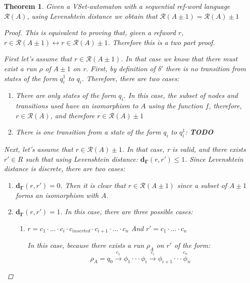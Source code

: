 \documentclass{article}
\newcommand{\lra}{\longrightarrow}
\newtheorem{theorem}{Theorem}
\begin{document}
\begin{theorem}
    Given a VSet-automaton with a sequential ref-word language $\mathcal{R}(A)$, using Levenshtein distance we obtain that $\mathcal{R}(A \pm 1) = \mathcal{R}(A) \pm 1$

    \begin{proof}
        This is equivalent to proving that, given a refword $r$, $r \in \mathcal{R}(A \pm 1) \leftrightarrow r \in \mathcal{R}(A)\pm 1$. Therefore this is a two part proof.

        First let's assume that $r \in \mathcal{R}(A \pm 1)$. In that case we know that there must exist a run $\rho$ of $A \pm 1$ on r. First, by definition of $\delta'$ there is no transition from states of the form $q_i^1$ to $q_i$. Therefore, there are two cases:
        \begin{enumerate}
            \item There are only states of the form $q_i$. In this case, the subset of nodes and transitions used have an isomorphism to $A$ using the function $f$, therefore, $r \in \mathcal{R}(A)$, and therefore $r \in \mathcal{R}(A) \pm 1$
            \item There is one transition from a state of the form $q_i$ to $q_i^1$: \textbf{TODO}
        \end{enumerate}

        Next, let's assume that $r \in \mathcal{R}(A) \pm 1$. In that case, r is valid, and there exists $r' \in R$ such that using Levenshtein distance: $\mathbf{d_\Gamma}(r, r') \leq 1$. Since Levenshtein distance is discrete, there are two cases:
        \begin{enumerate}
            \item $\mathbf{d_\Gamma}(r, r') = 0$. Then it is clear that $r \in \mathcal{R}(A \pm 1)$ since a subset of $A \pm 1$ forms an isomorphism with $A$.
            \item $\mathbf{d_\Gamma}(r, r') = 1$. In this case, there are three possible cases:
                \begin{enumerate}
                    \item $ r = c_1 \cdot ... \cdot c_i \cdot c_{inserted} \cdot c_{i + 1} \cdot ... \cdot c_n$  And $r' = c_1 \cdot ... \cdot c_n$

                        In this case, because there exists a run $\rho_A$ on $r'$ of the form:
                        \begin{equation*}
                            \rho_A = q_0 \overset{c_1}{\lra} \phi_1 \cdot\cdot\cdot \phi_i \overset{c_i}{\lra} \phi_{i + 1}  \cdot \cdot \cdot \overset{c_n} \phi_n
                        \end{equation*}


\end{enumerate}
\end{enumerate}
\end{proof}
\end{theorem}
\end{document}
